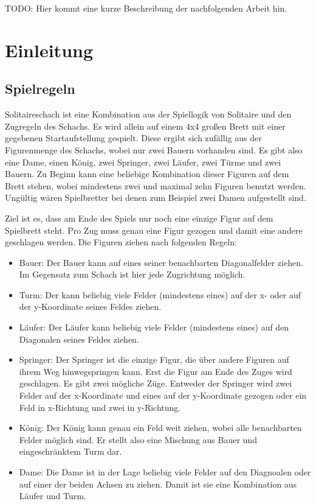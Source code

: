 \documentclass[
	12pt,
	a4paper,
	BCOR10mm,
	DIV14,
	listof=totoc,
	bibliography=totoc,
	headsepline
]{scrreprt}
\begin{document}
TODO: Hier kommt eine kurze Beschreibung der nachfolgenden Arbeit hin.

\tableofcontents

\chapter{Einleitung}
\label{Einleitung}

\section{Spielregeln}
Solitaireschach ist eine Kombination aus der Spiellogik von Solitaire und 
den Zugregeln des Schachs. Es wird allein auf einem 4x4 großen Brett mit einer gegebenen Startaufstellung gespielt. Diese ergibt sich zufällig aus der Figurenmenge des Schachs, wobei nur zwei Bauern vorhanden sind. Es gibt also eine Dame,
einen König, zwei Springer, zwei Läufer, zwei Türme und zwei Bauern. 
Zu Beginn kann eine beliebige Kombination dieser Figuren auf dem Brett stehen, wobei mindestens zwei und maximal zehn Figuren benutzt werden.
Ungültig wären Spielbretter bei denen zum Beispiel zwei Damen aufgestellt sind.


Ziel ist es, dass am Ende des Spiels nur noch eine einzige Figur auf dem Spielbrett steht. Pro Zug muss genau eine Figur gezogen und damit eine andere geschlagen werden.
Die Figuren ziehen nach folgenden Regeln:
\begin{itemize}
\item Bauer: 
Der Bauer kann auf eines seiner benachbarten Diagonalfelder ziehen. Im Gegensatz zum Schach ist hier jede Zugrichtung möglich.
\item Turm: Der kann beliebig viele Felder (mindestens eines) auf der x- oder auf der y-Koordinate seines Feldes ziehen.
\item Läufer: Der Läufer kann beliebig viele Felder (mindestens eines) auf den Diagonalen seines Feldes ziehen.
\item Springer: Der Springer ist die einzige Figur, die über andere Figuren auf ihrem Weg hinwegspringen kann. Erst die Figur am Ende des Zuges wird geschlagen. Es gibt zwei mögliche Züge. Entweder der Springer wird zwei Felder auf der x-Koordinate und eines auf der y-Koordinate gezogen oder ein Feld in x-Richtung und zwei in y-Richtung. 
\item König: Der König kann genau ein Feld weit ziehen, wobei alle benachbarten Felder möglich sind. Er stellt also eine Mischung aus Bauer und eingeschränktem Turm dar.
\item Dame: Die Dame ist in der Lage beliebig viele Felder auf den Diagnoalen oder auf einer der beiden Achsen zu ziehen. Damit ist sie eine Kombination aus Läufer und Turm.
\end{itemize}
\end{document}
